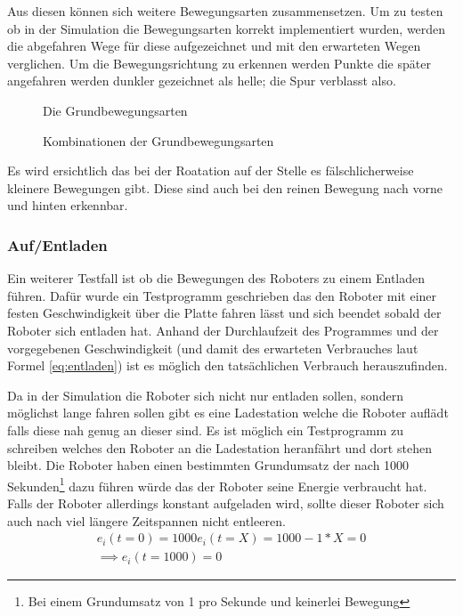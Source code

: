 {Aus diesen k{\"{o}}nnen sich weitere Bewegungsarten zusammensetzen. Um zu testen ob in der Simulation die Bewegungsarten korrekt implementiert
wurden, werden die abgefahren Wege f{\"{u}}r diese aufgezeichnet und mit den erwarteten Wegen verglichen. Um die Bewegungsrichtung zu erkennen
werden Punkte die sp{\"{a}}ter angefahren werden dunkler gezeichnet als helle; die Spur verblasst also.
\begin{figure}
	\centering
	\caption{Die Grundbewegungsarten}
	\label{fig:move1}
\end{figure}%
\begin{figure}
	\centering
	\caption{Kombinationen der Grundbewegungsarten}
	\label{fig:move2}
\end{figure}

Es wird ersichtlich das bei der Roatation auf der Stelle es f{\"{a}}lschlicherweise kleinere Bewegungen gibt. Diese sind auch bei den reinen
Bewegung nach vorne und hinten erkennbar.

\subsubsection{Auf/Entladen}
Ein weiterer Testfall ist ob die Bewegungen des Roboters zu einem Entladen f{\"{u}}hren. Daf{\"{u}}r wurde ein Testprogramm geschrieben
das den Roboter mit einer festen Geschwindigkeit {\"{u}}ber die Platte fahren l{\"{a}}sst und sich beendet sobald der Roboter sich
entladen hat. Anhand der Durchlaufzeit des Programmes und der vorgegebenen Geschwindigkeit (und damit des erwarteten Verbrauches
laut Formel \ref{eq:entladen}) ist es m{\"{o}}glich den tats{\"{a}}chlichen Verbrauch herauszufinden.


Da in der Simulation die Roboter sich nicht nur entladen sollen, sondern m{\"{o}}glichst lange fahren sollen gibt es eine
Ladestation welche die Roboter aufl{\"{a}}dt falls diese nah genug an dieser sind. Es ist m{\"{o}}glich ein Testprogramm zu
schreiben welches den Roboter an die Ladestation heranf{\"{a}}hrt und dort stehen bleibt. Die Roboter haben einen bestimmten
Grundumsatz der nach 1000 Sekunden\footnote{Bei einem Grundumsatz von 1 pro Sekunde und keinerlei Bewegung}
dazu f{\"{u}}hren w{\"{u}}rde das der Roboter seine Energie verbraucht hat. Falls der Roboter allerdings
konstant aufgeladen wird, sollte dieser Roboter sich auch nach viel l{\"{a}}ngere Zeitspannen nicht entleeren.
\begin{subequations}\label{eq:eval:laden}
\begin{align}
 e_i(t = 0) = 1000
	e_i(t = X) = 1000 - 1 * X  = 0 \\
	\implies e_i(t = 1000) = 0
\end{align}
\end{subequations}

}
